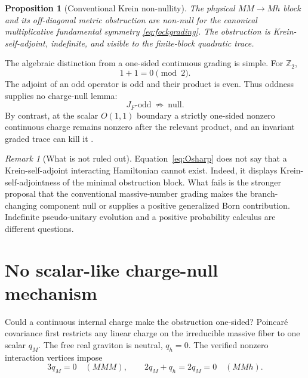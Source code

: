 \documentclass[11pt]{article}
\newtheorem{proposition}[theorem]{Proposition}
\theoremstyle{definition}
\theoremstyle{remark}
\newtheorem{remark}[theorem]{Remark}
\begin{document}
\begin{proposition}[Conventional Krein non-nullity]
\label{prop:nonnull}
The physical $MM\to Mh$ block and its off-diagonal metric obstruction
are non-null for the canonical multiplicative fundamental symmetry
\eqref{eq:fockgrading}.  The obstruction is Krein-self-adjoint,
indefinite, and visible to the finite-block quadratic trace.
\end{proposition}

The algebraic distinction from a one-sided continuous grading is simple.
For $\mathbb Z_2$,
\begin{equation}
1+1=0\pmod2.
\end{equation}
The adjoint of an odd operator is odd and their product is even.  Thus
oddness supplies no charge-null lemma:
\begin{equation}\label{eq:oddnotnull}
\boxed{J_F\text{-odd}\ \not\Longrightarrow\ \text{null}.}
\end{equation}
By contrast, at the scalar $O(1,1)$ boundary a strictly one-sided
nonzero continuous charge remains nonzero after the relevant product,
and an invariant graded trace can kill it \cite{paperV,BT2026}.

\begin{remark}[What is not ruled out]
Equation~\eqref{eq:Osharp} does not say that a Krein-self-adjoint
interacting Hamiltonian cannot exist.  Indeed, it displays
Krein-self-adjointness of the minimal obstruction block.  What fails is
the stronger proposal that the conventional massive-number grading makes
the branch-changing component null or supplies a positive generalized
Born contribution.  Indefinite pseudo-unitary evolution and a positive
probability calculus are different questions.
\end{remark}

\section{No scalar-like charge-null mechanism}\label{sec:charge}

Could a continuous internal charge make the obstruction one-sided?
Poincar\'e covariance first restricts any linear
charge on the irreducible massive fiber to one scalar $q_M$.  The free
real graviton is neutral, $q_h=0$.  The verified nonzero interaction
vertices impose
\begin{equation}\label{eq:charges}
3q_M=0\quad(MMM),
\qquad
2q_M+q_h=2q_M=0\quad(MMh).
\end{equation}
\end{document}
